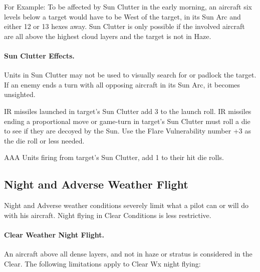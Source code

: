 For Example: To be affected by Sun Clutter in the early morning, an aircraft six levels below a target would have to be West of the target, in its Sun Arc and either 12 or 13 hexes away. Sun Clutter is only possible if the involved aircraft are all above the highest cloud layers and the target is not in Haze.

\paragraph{Sun Clutter Effects.} Units in Sun Clutter may not be used to visually search for or padlock the target. If an enemy ends a turn with all opposing aircraft in its Sun Arc, it becomes unsighted.

IR missiles launched in target's Sun Clutter add 3 to the launch roll. IR missiles ending a proportional move or game-turn in target's Sun Clutter must roll a die to see if they are decoyed by the Sun. Use the Flare Vulnerability number +3 as the die roll or less needed.

AAA Units firing from target's Sun Clutter, add 1 to their hit die rolls.

\subsection{Night and Adverse Weather Flight}

Night and Adverse weather conditions severely limit what a pilot can or will do with his aircraft. Night flying in Clear Conditions is less restrictive.

\paragraph{Clear Weather Night Flight.} An aircraft above all dense layers, and not in haze or stratus is considered in the Clear. The following limitations apply to Clear Wx night flying:

